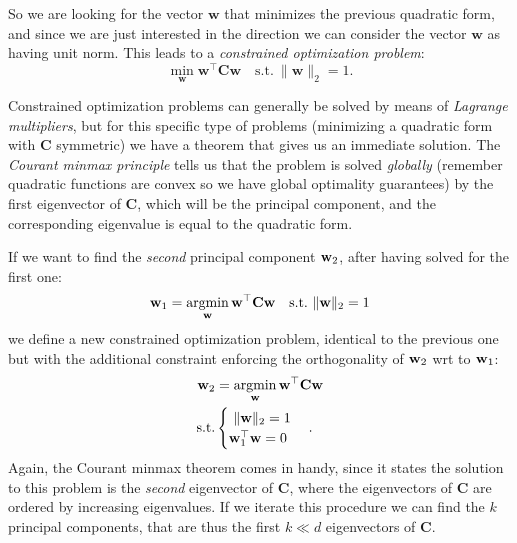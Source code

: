 So we are looking for the vector $\mathbf{w}$ that minimizes the previous quadratic form, and since we are just interested in the direction we can consider the vector $\mathbf{w}$ as having unit norm. This leads to a \emph{constrained optimization problem}:
\begin{equation}
	\min_{\mathbf{w}} \mathbf{w}^\top \mathbf{C} \mathbf{w} \quad \text{s.t.} \ \|\mathbf{w}\|_2 = 1.
\end{equation}

Constrained optimization problems can generally be solved by means of \emph{Lagrange multipliers}, but for this specific type of problems (minimizing a quadratic form with $\mathbf{C}$ symmetric) we have a theorem that gives us an immediate solution.
The \emph{Courant minmax principle} tells us that the problem is solved \emph{globally} (remember quadratic functions are convex so we have global optimality guarantees) by the first eigenvector of $\mathbf{C}$, which will be the principal component, and the corresponding eigenvalue is equal to the quadratic form.

If we want to find the \emph{second} principal component $\vb{w}_2$, after having solved for the first one:
\begin{equation}
	\mathbf{w}_1 = \argmin_{\mathbf{w}} \mathbf{w}^\top \mathbf{C} \mathbf{w} \quad \text{s.t.} \ \|\mathbf{w}\|_2 = 1
\end{equation}
we define a new constrained optimization problem, identical to the previous one but with the additional constraint enforcing the orthogonality of $\vb{w}_2$ wrt to $\vb{w}_1$:
\begin{equation}
    \begin{aligned}
        \mathbf{w}_2 & = \operatorname*{\operatorname{argmin}}_{\mathbf{w}} \mathbf{w}^\top \mathbf{C} \mathbf{w} \\
        \text{s.t.} & \begin{cases}
            \ \|\mathbf{w}\|_2 = 1 \\
            \mathbf{w}_1^\top \mathbf{w} = 0
        \end{cases}.
    \end{aligned}
\end{equation}
Again, the Courant minmax theorem comes in handy, since it states the solution to this problem is the \emph{second} eigenvector of $\mathbf{C}$, where the eigenvectors of $\mathbf{C}$ are ordered by increasing eigenvalues. If we iterate this procedure we can find the $k$ principal components, that are thus the first $k \ll d$ eigenvectors of $\mathbf{C}$.
\\

